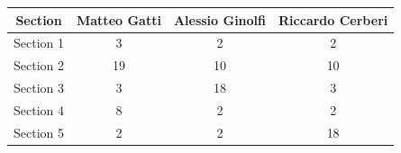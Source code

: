 \begin{center}
    \begin{tabular}{ cccc } 
    \toprule
        \textbf{Section} & \textbf{Matteo Gatti} & \textbf{Alessio Ginolfi} & \textbf{Riccardo Cerberi} \\
    \midrule
        Section 1 & 3 & 2 & 2 \\ 
        Section 2 & 19 & 10 & 10 \\
        Section 3 & 3 & 18 & 3 \\
        Section 4 & 8 & 2 & 2 \\ 
        Section 5 & 2 & 2 & 18 \\ 
    \bottomrule
    \end{tabular}
\end{center}

\newpage
